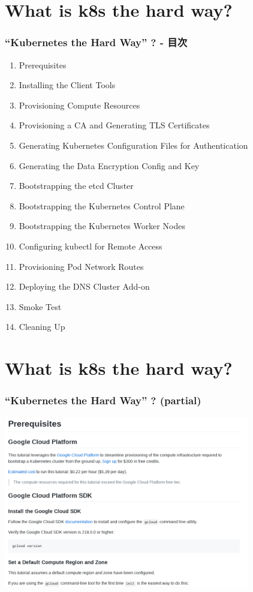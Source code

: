 \documentclass[aspectratio=169,11pt,hyperref={colorlinks=true}]{beamer}
\begin{document}
\section{What is k8s the hard way?}
\begin{frame}
  \frametitle{``Kubernetes the Hard Way'' ? - 目次}
  \begin{enumerate}
    \item Prerequisites
    \item Installing the Client Tools
    \item Provisioning Compute Resources
    \item Provisioning a CA and Generating TLS Certificates
    \item Generating Kubernetes Configuration Files for Authentication
    \item Generating the Data Encryption Config and Key
    \item Bootstrapping the etcd Cluster
    \item Bootstrapping the Kubernetes Control Plane
    \item Bootstrapping the Kubernetes Worker Nodes
    \item Configuring kubectl for Remote Access
    \item Provisioning Pod Network Routes
    \item Deploying the DNS Cluster Add-on
    \item Smoke Test
    \item Cleaning Up
  \end{enumerate}
\end{frame}

\section{What is k8s the hard way?}
\begin{frame}
  \frametitle{``Kubernetes the Hard Way'' ? (partial)}
  \includegraphics[height=75mm]{images/screenshot-k8s-the-hard-way.png}
\end{frame}
\end{document}
